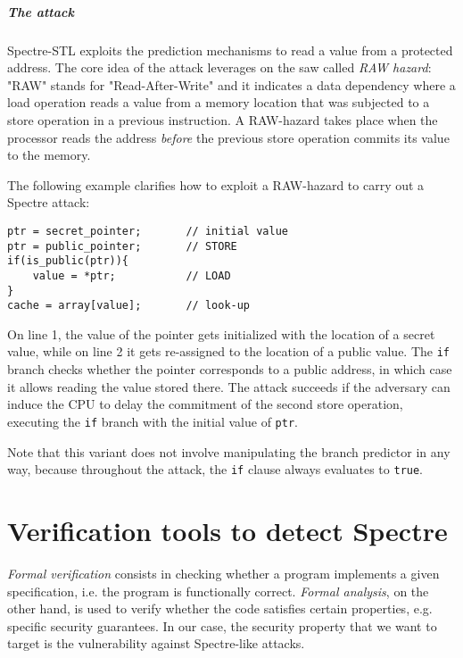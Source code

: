 \documentclass[12pt,a4paper]{book}
\theoremstyle{definition}
\begin{document}
	\paragraph{The attack} Spectre-STL exploits the prediction mechanisms to read a value from a protected address. The core idea of the attack leverages on the saw called \textit{RAW hazard}: "RAW" stands for "Read-After-Write" and it indicates a data dependency where a load operation reads a value from a memory location that was subjected to a store operation in a previous instruction. A RAW-hazard takes place when the processor reads the address \textit{before} the previous store operation commits its value to the memory.
	
	The following example clarifies how to exploit a RAW-hazard to carry out a Spectre attack:
	
	\vspace{3mm}
	\begin{minipage}{.6\textwidth}
		\begin{lstlisting}
ptr = secret_pointer;		// initial value
ptr = public_pointer;		// STORE
if(is_public(ptr)){	
	value = *ptr;			// LOAD
}
cache = array[value];		// look-up
		\end{lstlisting}
	\end{minipage}
	
	On line 1, the value of the pointer gets initialized with the location of a secret value, while on line 2 it gets re-assigned to the location of a public value. The \texttt{if} branch checks whether the pointer corresponds to a public address, in which case it allows reading the value stored there. The attack succeeds if the adversary can induce the CPU to delay the commitment of the second store operation, executing the \texttt{if} branch with the initial value of \texttt{ptr}.
	
	Note that this variant does not involve manipulating the branch predictor in any way, because throughout the attack, the \texttt{if} clause always evaluates to \texttt{true}.
	
	\chapter{Verification tools to detect Spectre}\label{chapter:verification}
	
	\textit{Formal verification} consists in checking whether a program implements a given specification, i.e. the program is functionally correct. \textit{Formal analysis}, on the other hand, is used to verify whether the code satisfies certain properties, e.g. specific security guarantees. In our case, the security property that we want to target is the vulnerability against Spectre-like attacks. 
	
\end{document}
